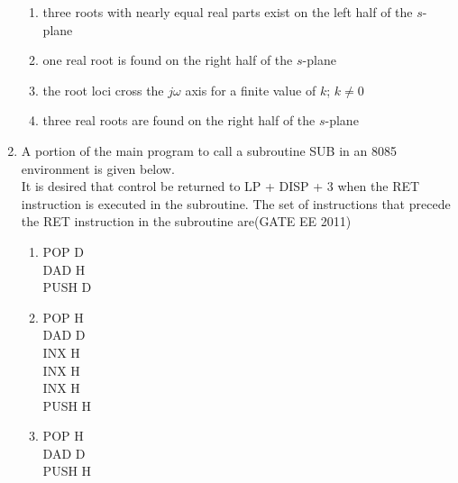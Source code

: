 \documentclass[a4paper,10pt]{exam}
\theoremstyle{remark}
\begin{document}
\begin{enumerate}
\begin{enumerate}
  \item three roots with nearly equal real parts exist on the left half of the $s$-plane
  \item one real root is found on the right half of the $s$-plane
  \item the root loci cross the $j\omega$ axis for a finite value of $k$; $k \neq 0$
  \item three real roots are found on the right half of the $s$-plane
\end{enumerate}
\item \quad A portion of the main program to call a subroutine SUB in an 8085 environment is given below.\\
It is desired that control be returned to LP + DISP + 3 when the RET instruction is executed in the subroutine. The set of instructions that precede the RET instruction in the subroutine are\hfill{(GATE EE 2011)}

\begin{multicols}{2}
\begin{enumerate}
  \item POP    D \\
        DAD    H \\
        PUSH   D
        
  \item POP    H \\
        DAD    D \\
        INX    H \\
        INX    H \\
        INX    H \\
        PUSH   H
        
  \item POP    H \\
        DAD    D \\
        PUSH   H
        

\end{enumerate}
\end{multicols}
\end{enumerate}
\end{document}
